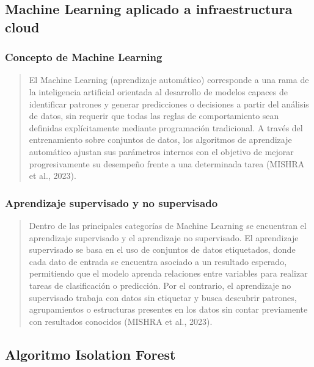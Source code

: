\documentclass[
]{article}
\begin{document}
\subsection{Machine Learning aplicado a infraestructura
cloud}\label{machine-learning-aplicado-a-infraestructura-cloud}

\subsubsection{Concepto de Machine
Learning}\label{concepto-de-machine-learning}

\begin{quote}
El Machine Learning (aprendizaje automático) corresponde a una rama de
la inteligencia artificial orientada al desarrollo de modelos capaces de
identificar patrones y generar predicciones o decisiones a partir del
análisis de datos, sin requerir que todas las reglas de comportamiento
sean definidas explícitamente mediante programación tradicional. A
través del entrenamiento sobre conjuntos de datos, los algoritmos de
aprendizaje automático ajustan sus parámetros internos con el objetivo
de mejorar progresivamente su desempeño frente a una determinada tarea
(MISHRA et al., 2023).
\end{quote}

\subsubsection{Aprendizaje supervisado y no
supervisado}\label{aprendizaje-supervisado-y-no-supervisado}

\begin{quote}
Dentro de las principales categorías de Machine Learning se encuentran
el aprendizaje supervisado y el aprendizaje no supervisado. El
aprendizaje supervisado se basa en el uso de conjuntos de datos
etiquetados, donde cada dato de entrada se encuentra asociado a un
resultado esperado, permitiendo que el modelo aprenda relaciones entre
variables para realizar tareas de clasificación o predicción. Por el
contrario, el aprendizaje no supervisado trabaja con datos sin etiquetar
y busca descubrir patrones, agrupamientos o estructuras presentes en los
datos sin contar previamente con resultados conocidos (MISHRA et al.,
2023).
\end{quote}

\subsection{Algoritmo Isolation
Forest}\label{algoritmo-isolation-forest}
\end{document}
